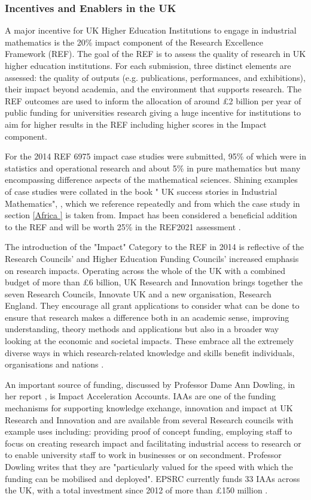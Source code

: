 \documentclass[11pt]{article} %
\begin{document}
\subsubsection{Incentives and Enablers in the UK} 
A major incentive for UK Higher Education Institutions to engage in industrial mathematics is the 20\% impact component of the Research Excellence Framework (REF). The goal of the REF is to assess the quality of research in UK higher education institutions. For each submission, three distinct elements are assessed: the quality of outputs (e.g. publications, performances, and exhibitions), their impact beyond academia, and the environment that supports research. The REF outcomes are used to inform the allocation of around £2 billion per year of public funding for universities research giving a huge  incentive for institutions to aim for higher results in the REF including higher scores in the Impact component.

 For the 2014 REF 6975 impact case studies were submitted, 95\% of which were in statistics and operational research and about 5\% in pure mathematics but many encompassing difference aspects of the mathematical sciences. Shining examples of case studies were collated in the book " UK success stories in Industrial Mathematics", \cite{Aston2016},  which we reference repeatedly and from which the case study in section \ref{Africa } is taken from. Impact has been considered a beneficial addition to the REF and will be worth 25\% in the REF2021 assessment \cite{REF2017}.

The introduction of the "Impact" Category to the REF in 2014 is reflective of the Research Councils' and Higher Education Funding Councils' increased emphasis on research impacts. Operating across the whole of the UK with a combined budget of more than £6 billion, UK Research and Innovation brings together the seven Research Councils, Innovate UK and a new organisation, Research England. They encourage all grant applications to consider  what can be done to ensure that research makes a difference both in an academic sense, improving understanding, theory methods and applications but also in a broader way looking at the economic and societal impacts. These embrace all the extremely diverse ways in which research-related knowledge and skills benefit individuals, organisations and nations \cite{UKRI}. 

An important source of funding, discussed by Professor Dame Ann Dowling, in her report \cite{DOWLING2015}, is Impact Acceleration Accounts. IAAs are one of the funding mechanisms for supporting knowledge exchange, innovation and impact at UK Research and Innovation and are available from several Research councils with example uses including: providing proof of concept funding, employing staff to focus on creating research impact and facilitating industrial access to research or to enable university staff to work in businesses or on secondment. Professor Dowling writes that they are "particularly valued for the speed with which the funding can be mobilised and deployed".  EPSRC currently funds 33 IAAs across the UK, with a total investment since 2012 of more than £150 million \cite{IAA}.
		
\end{document}
